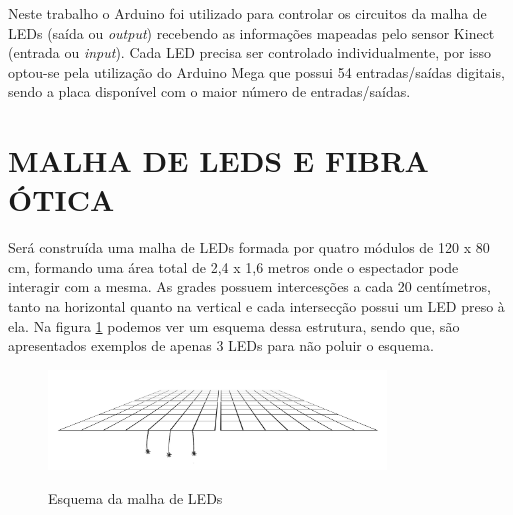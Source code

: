 Neste trabalho o Arduino foi utilizado para controlar os circuitos da malha de LEDs (saída ou \textit{output}) recebendo as informações mapeadas pelo sensor Kinect (entrada ou \textit{input}). Cada LED precisa ser controlado individualmente, por isso optou-se pela utilização do Arduino Mega que possui 54 entradas/saídas digitais, sendo a placa disponível com o maior número de entradas/saídas.


\section{MALHA DE LEDS E FIBRA ÓTICA}

Será construída uma malha de LEDs formada por quatro módulos de 120 x 80 cm, formando uma área total de 2,4 x 1,6 metros onde o espectador pode interagir com a mesma. As grades possuem intercesções a cada 20 centímetros, tanto na horizontal quanto na vertical e cada intersecção possui um LED preso à ela. Na figura \ref{fig:malha} podemos ver um esquema dessa estrutura, sendo que, são apresentados exemplos de apenas 3 LEDs para não poluir o esquema.

\begin{figure}[H]
    \centering
    \caption{Esquema da malha de LEDs}
	\vspace*{0,2cm}
    \includegraphics[width=0.8\textwidth]{./04-figuras/malha}
    \label{fig:malha}
\end{figure}
\vspace*{-0,9cm}
{\raggedright {}}\\

